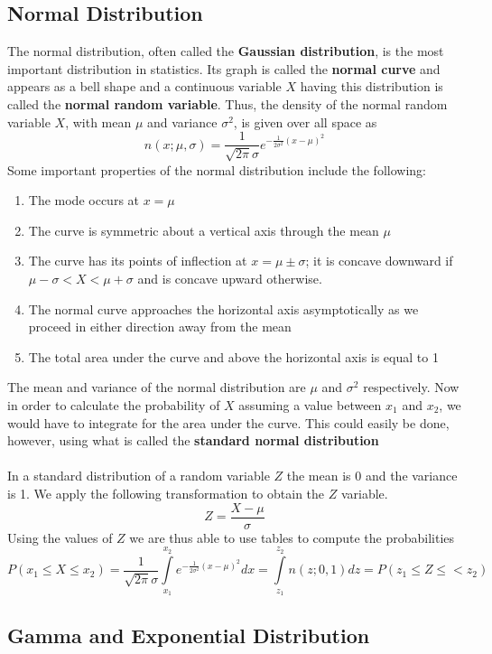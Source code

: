 \documentclass[11pt]{article}
\begin{document}
\subsection{Normal Distribution}
The normal distribution, often called the \textbf{Gaussian distribution}, is the most important distribution in statistics. Its graph is called the \textbf{normal curve} and appears as a bell shape and a continuous variable $X$ having this distribution is called the \textbf{normal random variable}. Thus, the density of the normal random variable $X$, with mean $\mu$ and variance $\sigma^2$, is given over all space as
$$ n(x; \mu, \sigma) = \frac{1}{\sqrt{2\pi}\sigma} e ^ {- \frac{1}{2\sigma^2} (x-\mu)^2}$$
Some important properties of the normal distribution include the following:
\begin{enumerate}
\item The mode occurs at $x=\mu$
\item The curve is symmetric about a vertical axis through the mean $\mu$
\item The curve has its points of inflection at $x = \mu \pm \sigma$; it is concave downward if $ \mu - \sigma < X < \mu + \sigma $ and is concave upward otherwise.
\item The normal curve approaches the horizontal axis asymptotically as we proceed
in either direction away from the mean
\item The total area under the curve and above the horizontal axis is equal to 1
\end{enumerate}
The mean and variance of the normal distribution are $\mu$ and $\sigma^2$ respectively. Now in order to calculate the probability of $X$ assuming a value between $x_1$ and $x_2$, we would have to integrate for the area under the curve. This could easily be done, however, using what is called the \textbf{standard normal distribution} 
\\ \\ In a standard distribution of a random variable $Z$ the mean is 0 and the variance is 1. We apply the following transformation to obtain the $Z$ variable.
$$ Z  = \frac{X - \mu}{\sigma}$$
Using the values of $Z$ we are thus able to use tables to compute the probabilities
$$ P(x_1 \leq X \leq x_2) = \frac{1}{\sqrt{2\pi} \sigma} \int \limits _{x_1}^{x_2}  e ^ {- \frac{1}{2\sigma^2} (x-\mu)^2} dx = \int \limits _{z_1}^{z_2}  n(z; 0, 1) dz = P(z_1 \leq Z \leq  < z_2)$$
\subsection{Gamma and Exponential Distribution}
\end{document}

